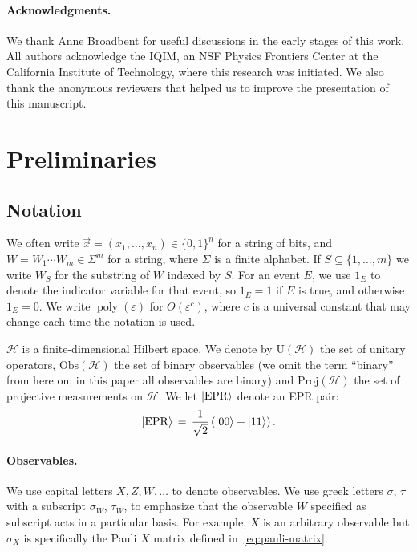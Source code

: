 \documentclass[11pt]{article}
\numberwithin{equation}{section}
\theoremstyle{definition}
\theoremstyle{plain}
\newcommand{\ket}[1]{|#1\rangle}
\newcommand{\setft}[1]{\mathrm{#1}}
\newcommand{\Proj}{\setft{Proj}}
\newcommand{\Obs}{\setft{Obs}}
\newcommand{\Unitary}{\setft{U}}
\DeclareMathOperator{\poly}{poly}
\newcommand{\mH}{\mathcal{H}}
\newcommand{\eps}{\varepsilon}
\newcommand{\EPR}{{\rm EPR}}
\begin{document}
\paragraph{Acknowledgments.} We thank Anne Broadbent for useful discussions in the early stages of this work. All authors acknowledge the IQIM, an NSF Physics Frontiers Center at the California Institute of Technology, where this research was initiated. We also thank the anonymous reviewers that helped us to improve the presentation of this manuscript.






\section{Preliminaries}\label{sec:prelim}


\subsection{Notation}
\label{sec:prelim-notation}

We often write $\vec{x} =(x_1,\ldots,x_n)\in \{0,1\}^n$ for a string of bits, and $W=W_1\cdots W_m\in\Sigma^m$ for a string, where $\Sigma$ is a finite alphabet. If $S\subseteq \{1,\ldots,m\}$ we write $W_S$ for the substring of $W$ indexed by $S$. For an event $E$, we use $1_{E}$ to denote the indicator variable for that event, so $1_E=1$ if $E$ is true, and otherwise $1_E=0$. We write $\poly(\eps)$ for $O(\eps^c)$, where $c$ is a universal constant that may change each time the notation is used. 

$\mH$ is a finite-dimensional Hilbert space.  We denote by $\Unitary(\mH)$ the set of unitary operators, $\Obs(\mH)$ the set of binary observables (we omit the term ``binary'' from here on; in this paper all observables are binary) and $\Proj(\mH)$ the set of projective measurements on $\mH$.
%
%
We let $\ket{\EPR}$ denote an EPR pair: 
$$\ket{\EPR}\,=\,\frac{1}{\sqrt{2}}\left(\ket{00}+\ket{11}\right).$$


\paragraph{Observables.}
We use capital letters $X,Z,W,\ldots$ to denote observables. We use greek letters $\sigma$, $\tau$ with a subscript $\sigma_W$, $\tau_W$, to emphasize that the observable $W$ specified as subscript acts in a particular basis. For example, $X$ is an arbitrary observable but $\sigma_X$ is specifically the Pauli $X$ matrix defined in~\eqref{eq:pauli-matrix}.
\end{document}
